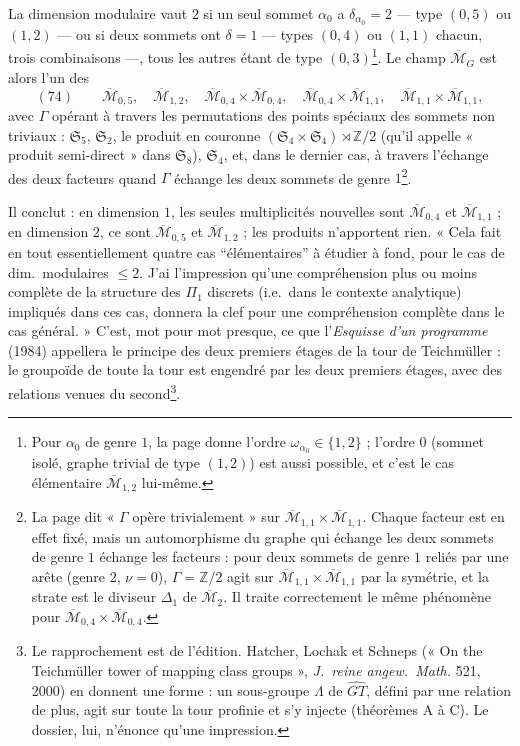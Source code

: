 \documentclass[11pt,a4paper]{article}
\begin{document}
La dimension modulaire vaut $2$ si un seul sommet $\alpha_0$ a $\delta_{\alpha_0} =
2$ — type $(0, 5)$ ou $(1, 2)$ — ou si deux sommets ont $\delta = 1$ — types
$(0,4)$ ou $(1,1)$ chacun, trois combinaisons —, tous les autres étant de type
$(0, 3)$\footnote{Pour $\alpha_0$ de genre $1$, la page donne l'ordre
$\omega_{\alpha_0} \in \{1, 2\}$ ; l'ordre $0$ (sommet isolé, graphe trivial de
type $(1, 2)$) est aussi possible, et c'est le cas élémentaire
$\overline{\mathcal{M}}_{1,2}$ lui-même.}. Le champ $\overline{\mathcal{M}}_G$ est
alors l'un des
\[
(74) \qquad \overline{\mathcal{M}}_{0,5}, \quad \overline{\mathcal{M}}_{1,2}, \quad
\overline{\mathcal{M}}_{0,4} \times \overline{\mathcal{M}}_{0,4}, \quad
\overline{\mathcal{M}}_{0,4} \times \overline{\mathcal{M}}_{1,1}, \quad
\overline{\mathcal{M}}_{1,1} \times \overline{\mathcal{M}}_{1,1},
\]
avec $\Gamma$ opérant à travers les permutations des points spéciaux des sommets
non triviaux : $\mathfrak{S}_5$, $\mathfrak{S}_2$, le produit en couronne
$(\mathfrak{S}_4 \times \mathfrak{S}_4) \rtimes \mathbb{Z}/2$ (qu'il appelle
« produit semi-direct » dans $\mathfrak{S}_8$), $\mathfrak{S}_4$, et, dans le
dernier cas, à travers l'échange des deux facteurs quand $\Gamma$ échange les
deux sommets de genre $1$\footnote{La page dit « $\Gamma$ opère trivialement » sur
$\overline{\mathcal{M}}_{1,1} \times \overline{\mathcal{M}}_{1,1}$. Chaque facteur
est en effet fixé, mais un automorphisme du graphe qui échange les deux sommets de
genre $1$ échange les facteurs : pour deux sommets de genre $1$ reliés par une
arête (genre $2$, $\nu = 0$), $\Gamma = \mathbb{Z}/2$ agit sur
$\overline{\mathcal{M}}_{1,1} \times \overline{\mathcal{M}}_{1,1}$ par la symétrie,
et la strate est le diviseur $\Delta_1$ de $\overline{\mathcal{M}}_2$. Il traite
correctement le même phénomène pour $\overline{\mathcal{M}}_{0,4} \times
\overline{\mathcal{M}}_{0,4}$.}.

Il conclut : en dimension $1$, les seules multiplicités nouvelles sont
$\overline{\mathcal{M}}_{0,4}$ et $\overline{\mathcal{M}}_{1,1}$ ; en dimension
$2$, ce sont $\overline{\mathcal{M}}_{0,5}$ et $\overline{\mathcal{M}}_{1,2}$ ;
les produits n'apportent rien. « Cela fait en tout essentiellement quatre cas
“élémentaires” à étudier à fond, pour le cas de dim.\ modulaires $\leq 2$. J'ai
l'impression qu'une compréhension plus ou moins complète de la structure des
$\Pi_1$ discrets (i.e.\ dans le contexte analytique) impliqués dans ces cas,
donnera la clef pour une compréhension complète dans le cas général. » C'est,
mot pour mot presque, ce que l'\emph{Esquisse d'un programme} (1984) appellera le
principe des deux premiers étages de la tour de Teichmüller : le groupoïde de
toute la tour est engendré par les deux premiers étages, avec des relations
venues du second\footnote{Le rapprochement est de l'édition. Hatcher, Lochak et Schneps
(« On the Teichmüller tower of mapping class groups », \emph{J.\ reine angew.\
Math.} 521, 2000) en donnent une forme : un sous-groupe $\Lambda$ de $\widehat{GT}$,
défini par une relation de plus, agit sur toute la tour profinie et s'y injecte
(théorèmes A à C). Le dossier, lui, n'énonce qu'une impression.}.
\end{document}
